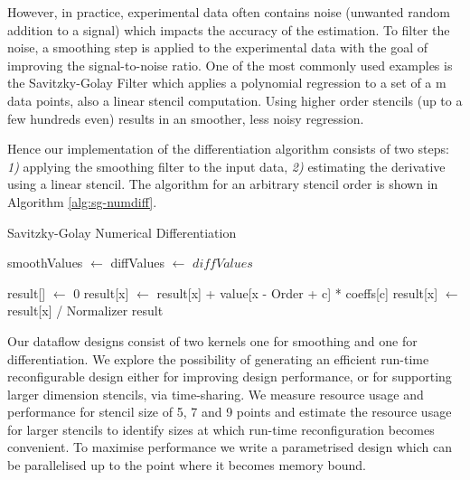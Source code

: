 However, in practice, experimental data often contains noise (unwanted
random addition to a signal) which impacts the accuracy of the
estimation. To filter the noise, a smoothing step is applied to the
experimental data with the goal of improving the signal-to-noise
ratio. One of the most commonly used examples is the Savitzky-Golay
Filter \cite{savitzky1964smoothing} which applies a polynomial
regression to a set of a m data points, also a linear stencil
computation.  Using higher order stencils (up to a few hundreds even)
results in an smoother, less noisy regression.

Hence our implementation of the differentiation algorithm consists of
two steps: \emph{1)} applying the smoothing filter to the input data,
\emph{2)} estimating the derivative using a linear stencil. The
algorithm for an arbitrary stencil order is shown in Algorithm
\ref{alg:sg-numdiff}.

\begin{algorithm}
  \caption{Savitzky-Golay Numerical Differentiation}
  \label{alg:sg-numdiff}
  \begin{algorithmic}
    \State smoothValues $\gets$ 
    \State diffValues  $\gets$ 
    \State \Return $diffValues$
    \EndFunction

    \State result[] $\gets$ 0
    \State result[x] $\gets$ result[x] + value[x - Order + c] * coeffs[c]
    \EndFor
    \State result[x] $\gets$ result[x] / Normalizer
    \EndFor
    \State \Return result
    \EndFunction
  \end{algorithmic}
\end{algorithm}

Our \FAST{} dataflow designs consist of two kernels one for smoothing
and one for differentiation. We explore the possibility of generating
an efficient run-time reconfigurable design either for improving
design performance, or for supporting larger dimension stencils, via
time-sharing. We measure resource usage and performance for stencil
size of 5, 7 and 9 points and estimate the resource usage for larger
stencils to identify sizes at which run-time reconfiguration becomes
convenient. To maximise performance we write a parametrised design
which can be parallelised up to the point where it becomes memory
bound.

